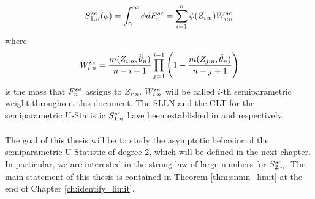 $$S_{1,n}^{se}(\phi)=\int_0^\infty \phi dF_n^{se} = \sum\limits_{i=1}^n \phi(Z_{i:n})W_{i:n}^{se}$$
where 
$$W_{i:n}^{se} = \frac{m(Z_{i:n}, \hat{\theta}_n)}{n-i+1} \prod\limits_{j=1}^{i-1}\left(1-\frac{m(Z_{j:n}, \hat{\theta}_n)}{n-j+1}\right)$$
is the mass that $F_n^{se}$ assigns to $Z_{i:n}$. $W_{i:n}^{se}$ will be called $i$-th semiparametric weight throughout this document. The SLLN and the CLT for the semiparametric U-Statistic $S_{1,n}^{se}$ have been established in \citet{dikta2000strong} and \citet{dikta2005central} respectively.\\
\\
The goal of this thesis will be to study the asymptotic behavior of the semiparametric U-Statistic of degree $2$, which will be defined in the next chapter. In particular, we are interested in the strong law of large numbers for $S_{2,n}^{se}$. The main statement of this thesis is contained in Theorem \ref{thm:snmn_limit} at the end of Chapter \ref{ch:identify_limit}.\\
\\
%
